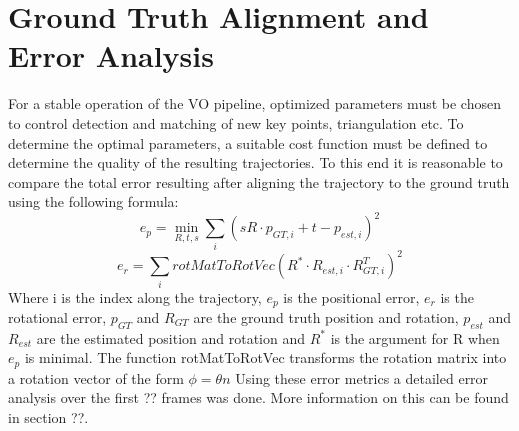 \section{Ground Truth Alignment and Error Analysis}
\label{simulation}

For a stable operation of the VO pipeline, optimized parameters must be chosen to control detection and matching of new key points, triangulation etc. To determine the optimal parameters, a suitable cost function must be defined to determine the quality of the resulting trajectories. To this end it is reasonable to compare the total error resulting after aligning the trajectory to the ground truth using the following formula:
\begin{equation}e_p = \underset{R,t,s}{\min} \sum_i (sR \cdot p_{GT, i} + t - p_{est, i})^2\end{equation}
$$e_r = \sum_i rotMatToRotVec(R^* \cdot R_{est,i} \cdot R_{GT, i}^T)^2$$
Where i is the index along the trajectory, $e_p$ is the positional error, $e_r$ is the rotational error, $p_{GT}$ and $R_{GT}$ are the ground truth position and rotation, $p_{est}$ and $R_{est}$ are the estimated position and rotation and $R^*$ is the argument for R when $e_p$ is minimal. The function rotMatToRotVec transforms the rotation matrix into a rotation vector of the form $\phi = \theta n$  Using these error metrics a detailed error analysis over the first ?? frames was done. More information on this can be found in section ??.

